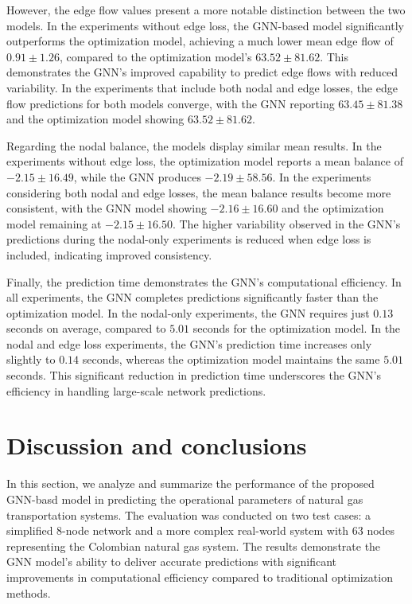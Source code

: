 However, the edge flow values present a more notable distinction between the two models. In the experiments without edge loss, the GNN-based model significantly outperforms the optimization model, achieving a much lower mean edge flow of $0.91 \pm 1.26$, compared to the optimization model’s $63.52 \pm 81.62$. This demonstrates the GNN’s improved capability to predict edge flows with reduced variability. In the experiments that include both nodal and edge losses, the edge flow predictions for both models converge, with the GNN reporting $63.45 \pm 81.38$ and the optimization model showing $63.52 \pm 81.62$.



Regarding the nodal balance, the models display similar mean results. In the experiments without edge loss, the optimization model reports a mean balance of $-2.15 \pm 16.49$, while the GNN produces $-2.19 \pm 58.56$. In the experiments considering both nodal and edge losses, the mean balance results become more consistent, with the GNN model showing $-2.16 \pm 16.60$ and the optimization model remaining at $-2.15 \pm 16.50$. The higher variability observed in the GNN’s predictions during the nodal-only experiments is reduced when edge loss is included, indicating improved consistency.

Finally, the prediction time demonstrates the GNN’s computational efficiency. In all experiments, the GNN completes predictions significantly faster than the optimization model. In the nodal-only experiments, the GNN requires just $0.13$ seconds on average, compared to $5.01$ seconds for the optimization model. In the nodal and edge loss experiments, the GNN’s prediction time increases only slightly to $0.14$ seconds, whereas the optimization model maintains the same $5.01$ seconds. This significant reduction in prediction time underscores the GNN’s efficiency in handling large-scale network predictions.

\section{Discussion and conclusions}

In this section, we analyze and summarize the performance of the proposed GNN-basd model in predicting the operational parameters of natural gas transportation systems. The evaluation was conducted on two test cases: a simplified 8-node network and a more complex real-world system with 63 nodes representing the Colombian natural gas system. The results demonstrate the GNN model's ability to deliver accurate predictions with significant improvements in computational efficiency compared to traditional optimization methods.


